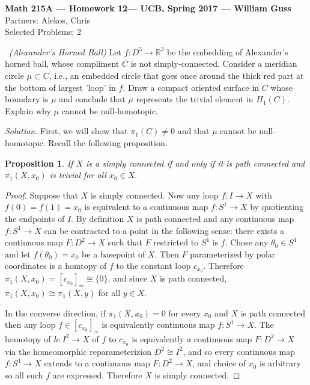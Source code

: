 \documentclass[11pt]{amsart}
\newtheorem{proposition}[theorem]{Proposition}
\theoremstyle{definition}
\numberwithin{theorem}{section}
\numberwithin{definition}{section}
\numberwithin{equation}{section}
\begin{document}
\begin{center}{\bf Math 215A --- Homework 12--- UCB, Spring 2017 --- William Guss} \\
Partners: Alekos, Chris \\
Selected Problems: 2
\end{center}


\medskip {}\ \emph{(Alexander's Horned Ball)} Let $f: D^3 \to \mathbb{R}^3$ be the embedding of Alexander's horned ball, whose compliment $C$ is not simply-connected. Consider a meridian circle $\mu \subset C$, i.e., an embedded circle that goes once around the thick red part at the bottom of largest 'loop' in $f$. Draw a compact oriented surface in $C$ whose boundary is $\mu$ and conclude that $\mu$ represents the trivial element in $H_1(C)$. Explain why $\mu$ cannot be null-homotopic. 

\medskip \noindent \emph{Solution.} First, we will show that $\pi_1(C) \neq 0$ and that $\mu$ cannot be null-homotopic. Recall the following proposition.
\begin{proposition}
  	If $X$ is a simply connected if and only if it is path connected and $\pi_1(X, x_0)$ is trivial for all $x_0 \in X.$
  \end{proposition}  
  \begin{proof}
  	Suppose that $X$ is simply connected. Now any loop $f: I \to X$ with $f(0)= f(1) = x_0$  is equivalent to a continuous map $f: S^1 \to X$ by quotienting the endpoints of $I$. By definition $X$ is path connected and any continuous map $f: S^1 \to X$ can be contracted to a point in the following sense: there exists a continuous map $F: D^2 \to X$ such that $F$ restricted to $S^1$ is $f$. Chose any $\theta_0 \in S^1$ and let $f(\theta_0) = x_0$ be a basepoint of $X.$ Then $F$ parameterized by polar coordinates is a homtopy of $f$ to the constant loop $c_{x_0}$. Therefore $\pi_1(X, x_0) = [c_{x_0}]_\simeq \cong \{0\}$, and since $X$ is path connected, $\pi_1(X, x_0) \cong \pi_1(X, y)$ for all $y \in X$. 

  	In the converse direction, if $\pi_1(X, x_0) = 0$ for every $x_0$ and $X$ is path connected then any loop $f \in [c_{x_0}]_\simeq$ is equivalently continuous map $f: S^1 \to X$. The homotopy of $h: I^2 \to X$ of $f$ to $c_{x_0}$ is equivalently a continuous map $F: D^2 \to X$ via the homeomorphic reparameterizion $D^2 \cong I^2$, and so every continuous map $f: S^1 \to X$ extends to a continuous map $F: D^2 \to X$, and choice of $x_0$ is arbitrary so all such $f$ are expressed. Therefore $X$ is simply connected.
  \end{proof}
\end{document}
